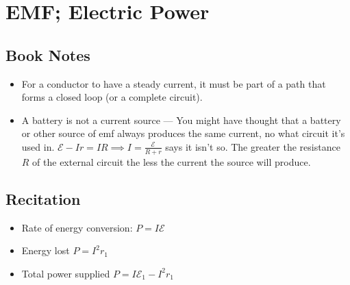 \documentclass[11pt]{article}
\newcommand{\chapterTitle}{EMF; Electric Power}
\begin{document}
\section{\chapterTitle}

\subsection{Book Notes}
\begin{itemize}
    \item For a conductor to have a steady current, it must be part of a path that forms a closed loop (or a complete circuit).
    \item A battery is not a current source --- You might have thought that a battery or other source of emf always produces the same current, no what circuit it's used in. $\mathcal{E} - Ir = IR \implies I = \frac{\mathcal{E}}{R + r}$ says it isn't so. The greater the resistance $R$ of the external circuit the less the current the source will produce.
\end{itemize}

\subsection{Recitation}
\begin{itemize}
    \item Rate of energy conversion: $P = I \mathcal{E} $
    \item Energy lost $P = I^2 r_1$
    \item Total power supplied $P = I \mathcal{E}_1 - I^2 r_1$
\end{itemize}
\end{document}
